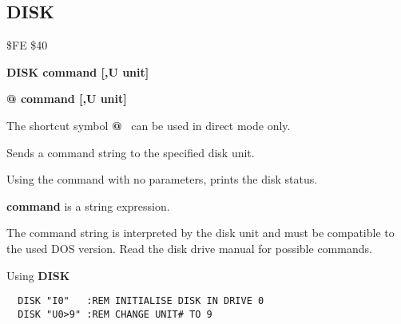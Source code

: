 \subsection{DISK}
\begin{description}[leftmargin=2cm,style=nextline]
\item [Token:] \$FE \$40
\item [Format:] {\bf DISK command [,U unit] }
\item [Format:] {\bf @ command [,U unit] }
\item [Usage:]

   The shortcut symbol {\bf @}  can be used in direct mode only.

   Sends a command string to the specified disk unit.

   Using the command with no parameters, prints the disk status.

   \unitdefinition

   {\bf command} is a string expression.

\item [Remarks:]
   The command string is interpreted by the disk unit
   and must be compatible to the used DOS version.
   Read the disk drive manual for possible commands.

\item [Example:] Using {\bf DISK}
\begin{tcolorbox}[colback=black,coltext=white]
\verbatimfont{\codefont}
\begin{verbatim}
  DISK "I0"   :REM INITIALISE DISK IN DRIVE 0
  DISK "U0>9" :REM CHANGE UNIT# TO 9
\end{verbatim}
\end{tcolorbox}
\end{description}


\newpage

